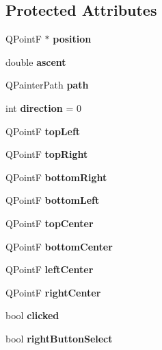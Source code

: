 \subsection*{Protected Attributes}
\begin{DoxyCompactItemize}
\item 
\mbox{\label{class_tile_ab9753327fa5861cc5c9b48c6ba632fca}} 
Q\+PointF $\ast$ {\bfseries position}
\item 
\mbox{\label{class_tile_aeb69860ce29868082a9278d2f06b3400}} 
double {\bfseries ascent}
\item 
\mbox{\label{class_tile_ad3415390d272158aaf215f24e3df237d}} 
Q\+Painter\+Path {\bfseries path}
\item 
\mbox{\label{class_tile_a148eb9ba30d682a2237ab8c82aacc8ef}} 
int {\bfseries direction} = 0
\item 
\mbox{\label{class_tile_af463934d32c7bc00ce055f5d9b43ad56}} 
Q\+PointF {\bfseries top\+Left}
\item 
\mbox{\label{class_tile_a72d12308d2f629ed6515906d6172cdf5}} 
Q\+PointF {\bfseries top\+Right}
\item 
\mbox{\label{class_tile_ad5f0c9de4bf667069e3b15c76e342d3e}} 
Q\+PointF {\bfseries bottom\+Right}
\item 
\mbox{\label{class_tile_a8b0e49655a83f4ba963d60ed090691e6}} 
Q\+PointF {\bfseries bottom\+Left}
\item 
\mbox{\label{class_tile_aec5e69248a51b044658dd2a003e688e0}} 
Q\+PointF {\bfseries top\+Center}
\item 
\mbox{\label{class_tile_a0e9bf5f9db2e052088b725f0842185aa}} 
Q\+PointF {\bfseries bottom\+Center}
\item 
\mbox{\label{class_tile_ac0b6a739c34575c2d1dbe4652b7067ab}} 
Q\+PointF {\bfseries left\+Center}
\item 
\mbox{\label{class_tile_a43401a39ad1237b944f91fae0f2c5a2a}} 
Q\+PointF {\bfseries right\+Center}
\item 
\mbox{\label{class_tile_a4e4c6171035a4d78baa4543eacf675c9}} 
bool {\bfseries clicked}
\item 
\mbox{\label{class_tile_a53485b5047c15f4ac12293cc47dde370}} 
bool {\bfseries right\+Button\+Select}
\end{DoxyCompactItemize}



